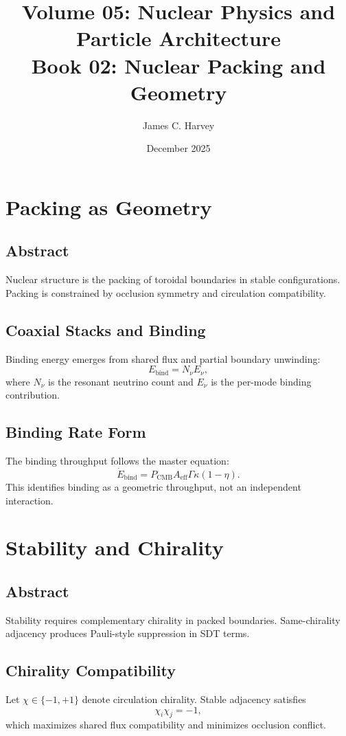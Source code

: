 \documentclass[12pt]{book}
\title{Volume 05: Nuclear Physics and Particle Architecture \\ Book 02: Nuclear Packing and Geometry}
\author{James C. Harvey}
\date{December 2025}
\begin{document}
\maketitle
\tableofcontents

\chapter{Packing as Geometry}

\section*{Abstract}
Nuclear structure is the packing of toroidal boundaries in stable configurations. Packing is constrained
by occlusion symmetry and circulation compatibility.

\section{Coaxial Stacks and Binding}
Binding energy emerges from shared flux and partial boundary unwinding:
\begin{equation}
E_{\text{bind}} = N_{\nu} E_{\nu},
\end{equation}
where $N_{\nu}$ is the resonant neutrino count and $E_{\nu}$ is the per-mode binding contribution.

\section{Binding Rate Form}
The binding throughput follows the master equation:
\begin{equation}
\dot{E}_{\text{bind}} = P_{\text{CMB}} A_{\text{eff}} \Gamma \kappa (1-\eta).
\end{equation}
This identifies binding as a geometric throughput, not an independent interaction.

\chapter{Stability and Chirality}

\section*{Abstract}
Stability requires complementary chirality in packed boundaries. Same-chirality adjacency produces
Pauli-style suppression in SDT terms.

\section{Chirality Compatibility}
Let $\chi \in \{-1,+1\}$ denote circulation chirality. Stable adjacency satisfies
\begin{equation}
\chi_i \chi_j = -1,
\end{equation}
which maximizes shared flux compatibility and minimizes occlusion conflict.
\end{document}
